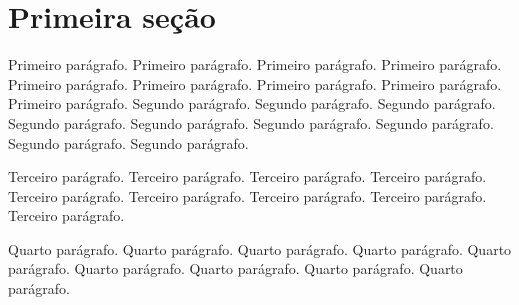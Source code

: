 \documentclass{article}
\begin{document}
	\section{Primeira seção}
	Primeiro parágrafo. Primeiro parágrafo. Primeiro parágrafo. Primeiro parágrafo. Primeiro parágrafo. Primeiro parágrafo.
	Primeiro parágrafo. Primeiro parágrafo. Primeiro parágrafo.
	\noindent Segundo parágrafo. Segundo parágrafo. Segundo parágrafo.
	Segundo parágrafo. Segundo parágrafo. Segundo parágrafo.
	Segundo parágrafo. Segundo parágrafo. Segundo parágrafo. %
	
	Terceiro parágrafo. Terceiro parágrafo. Terceiro parágrafo.
	Terceiro parágrafo. Terceiro parágrafo. Terceiro parágrafo.
	Terceiro parágrafo. Terceiro parágrafo. Terceiro parágrafo.\newpage
	
	Quarto parágrafo. Quarto parágrafo. Quarto parágrafo.
	Quarto parágrafo. Quarto parágrafo. Quarto parágrafo.
	Quarto parágrafo. Quarto parágrafo. Quarto parágrafo.
\end{document}
